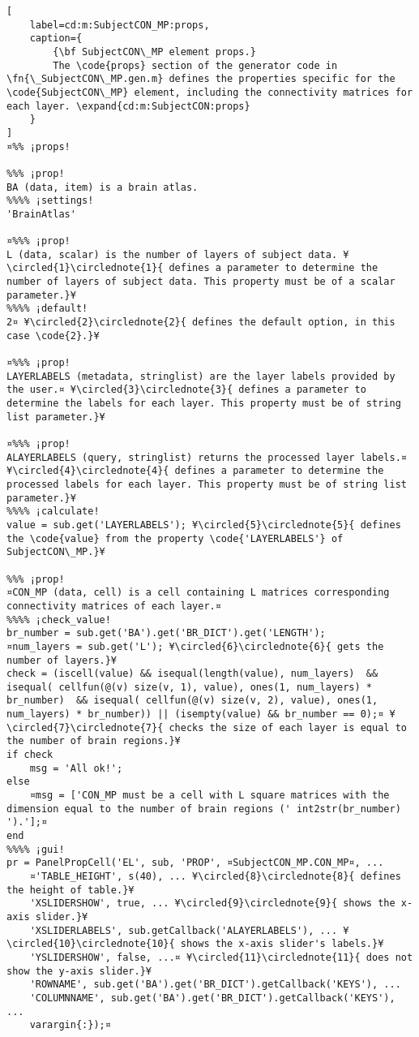 \documentclass{tufte-handout}
\begin{document}
\begin{lstlisting}[
	label=cd:m:SubjectCON_MP:props,
	caption={
		{\bf SubjectCON\_MP element props.}
		The \code{props} section of the generator code in \fn{\_SubjectCON\_MP.gen.m} defines the properties specific for the \code{SubjectCON\_MP} element, including the connectivity matrices for each layer. \expand{cd:m:SubjectCON:props}
	}
]
¤%% ¡props!

%%% ¡prop!
BA (data, item) is a brain atlas.
%%%% ¡settings!
'BrainAtlas'

¤%%% ¡prop! 
L (data, scalar) is the number of layers of subject data. ¥\circled{1}\circlednote{1}{ defines a parameter to determine the number of layers of subject data. This property must be of a scalar parameter.}¥
%%%% ¡default!
2¤ ¥\circled{2}\circlednote{2}{ defines the default option, in this case \code{2}.}¥

¤%%% ¡prop! 
LAYERLABELS (metadata, stringlist) are the layer labels provided by the user.¤ ¥\circled{3}\circlednote{3}{ defines a parameter to determine the labels for each layer. This property must be of string list parameter.}¥

¤%%% ¡prop!
ALAYERLABELS (query, stringlist) returns the processed layer labels.¤ ¥\circled{4}\circlednote{4}{ defines a parameter to determine the processed labels for each layer. This property must be of string list parameter.}¥
%%%% ¡calculate!
value = sub.get('LAYERLABELS'); ¥\circled{5}\circlednote{5}{ defines the \code{value} from the property \code{'LAYERLABELS'} of SubjectCON\_MP.}¥

%%% ¡prop!
¤CON_MP (data, cell) is a cell containing L matrices corresponding connectivity matrices of each layer.¤
%%%% ¡check_value!
br_number = sub.get('BA').get('BR_DICT').get('LENGTH');
¤num_layers = sub.get('L'); ¥\circled{6}\circlednote{6}{ gets the number of layers.}¥
check = (iscell(value) && isequal(length(value), num_layers)  && isequal( cellfun(@(v) size(v, 1), value), ones(1, num_layers) * br_number)  && isequal( cellfun(@(v) size(v, 2), value), ones(1, num_layers) * br_number)) || (isempty(value) && br_number == 0);¤ ¥\circled{7}\circlednote{7}{ checks the size of each layer is equal to the number of brain regions.}¥
if check
    msg = 'All ok!';
else   
    ¤msg = ['CON_MP must be a cell with L square matrices with the dimension equal to the number of brain regions (' int2str(br_number) ').'];¤
end
%%%% ¡gui! 
pr = PanelPropCell('EL', sub, 'PROP', ¤SubjectCON_MP.CON_MP¤, ...
    ¤'TABLE_HEIGHT', s(40), ... ¥\circled{8}\circlednote{8}{ defines the height of table.}¥
    'XSLIDERSHOW', true, ... ¥\circled{9}\circlednote{9}{ shows the x-axis slider.}¥
    'XSLIDERLABELS', sub.getCallback('ALAYERLABELS'), ... ¥\circled{10}\circlednote{10}{ shows the x-axis slider's labels.}¥
    'YSLIDERSHOW', false, ...¤ ¥\circled{11}\circlednote{11}{ does not show the y-axis slider.}¥
    'ROWNAME', sub.get('BA').get('BR_DICT').getCallback('KEYS'), ...
    'COLUMNNAME', sub.get('BA').get('BR_DICT').getCallback('KEYS'), ...
    varargin{:});¤

\end{lstlisting}
\end{document}
